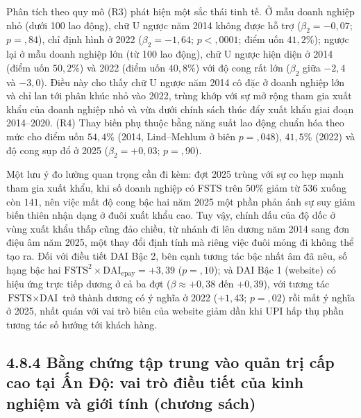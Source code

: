 \documentclass[
  a4paper,
  13pt]{extreport}
\begin{document}
Phân tích theo quy mô (R3) phát hiện một sắc thái tinh tế. Ở mẫu doanh
nghiệp nhỏ (dưới 100 lao động), chữ U ngược năm 2014 không được hỗ trợ
(\(\beta_2 = -0{,}07\); \(p = {,}84\)), chỉ định hình ở 2022
(\(\beta_2 = -1{,}64\); \(p < {,}0001\); điểm uốn \(41{,}2\%\)); ngược
lại ở mẫu doanh nghiệp lớn (từ 100 lao động), chữ U ngược hiện diện ở
2014 (điểm uốn \(50{,}2\%\)) và 2022 (điểm uốn \(40{,}8\%\)) với độ cong
rất lớn (\(\beta_2\) giữa \(-2{,}4\) và \(-3{,}0\)). Điều này cho thấy
chữ U ngược năm 2014 cô đặc ở doanh nghiệp lớn và chỉ lan tới phân khúc
nhỏ vào 2022, trùng khớp với sự mở rộng tham gia xuất khẩu của doanh
nghiệp nhỏ và vừa dưới chính sách thúc đẩy xuất khẩu giai đoạn
2014--2020. (R4) Thay biến phụ thuộc bằng năng suất lao động chuẩn hóa
theo mức cho điểm uốn \(54{,}4\%\) (2014, Lind--Mehlum ở biên
\(p = {,}048\)), \(41{,}5\%\) (2022) và độ cong sụp đổ ở 2025
(\(\beta_2 = +0{,}03\); \(p = {,}90\)).

Một lưu ý đo lường quan trọng cần đi kèm: đợt 2025 trùng với sự co hẹp
mạnh tham gia xuất khẩu, khi số doanh nghiệp có FSTS trên \(50\%\) giảm
từ \(536\) xuống còn \(141\), nên việc mất độ cong bậc hai năm 2025 một
phần phản ánh sự suy giảm biến thiên nhận dạng ở đuôi xuất khẩu cao. Tuy
vậy, chính dấu của độ dốc ở vùng xuất khẩu thấp cũng đảo chiều, từ nhánh
đi lên dương năm 2014 sang đơn điệu âm năm 2025, một thay đổi định tính
mà riêng việc đuôi mỏng đi không thể tạo ra. Đối với điều tiết DAI Bậc
2, bên cạnh tương tác bậc nhất âm đã nêu, số hạng bậc hai
\(\text{FSTS}^2 \times \text{DAI}_{\text{epay}} = +3{,}39\)
(\(p = {,}10\)); và DAI Bậc 1 (website) có hiệu ứng trực tiếp dương ở cả
ba đợt (\(\beta \approx +0{,}38\) đến \(+0{,}39\)), với tương tác
\(\text{FSTS} \times \text{DAI}\) trở thành dương có ý nghĩa ở 2022
(\(+1{,}43\); \(p = {,}02\)) rồi mất ý nghĩa ở 2025, nhất quán với vai
trò biên của website giảm dần khi UPI hấp thụ phần tương tác số hướng
tới khách hàng.

\hypertarget{bux1eb1ng-chux1ee9ng-tux1eadp-trung-vuxe0o-quux1ea3n-trux1ecb-cux1ea5p-cao-tux1ea1i-ux1ea5n-ux111ux1ed9-vai-truxf2-ux111iux1ec1u-tiux1ebft-cux1ee7a-kinh-nghiux1ec7m-vuxe0-giux1edbi-tuxednh-chux1b0ux1a1ng-suxe1ch}{%
\subsection{4.8.4 Bằng chứng tập trung vào quản trị cấp cao tại Ấn Độ:
vai trò điều tiết của kinh nghiệm và giới tính (chương
sách)}\label{bux1eb1ng-chux1ee9ng-tux1eadp-trung-vuxe0o-quux1ea3n-trux1ecb-cux1ea5p-cao-tux1ea1i-ux1ea5n-ux111ux1ed9-vai-truxf2-ux111iux1ec1u-tiux1ebft-cux1ee7a-kinh-nghiux1ec7m-vuxe0-giux1edbi-tuxednh-chux1b0ux1a1ng-suxe1ch}}
\end{document}
